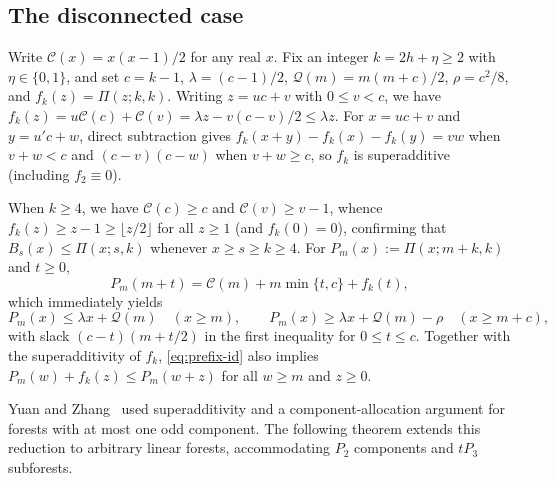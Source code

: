 \documentclass[10pt]{article}
\theoremstyle{compactplain}
\theoremstyle{remark}\newtheorem{remark}[theorem]{Remark}
\begin{document}
\subsection{The disconnected case}

Write $\mathcal{C}(x)=x(x-1)/2$ for any real $x$. Fix an integer
$k=2h+\eta\ge2$ with $\eta\in\{0,1\}$, and set $c=k-1$,
$\lambda=(c-1)/2$, $\mathcal{Q}(m)=m(m+c)/2$, $\rho=c^2/8$, and
$f_k(z)=\Pi(z;k,k)$. Writing $z=uc+v$ with $0\le v<c$, we have
$f_k(z)=u\mathcal{C}(c)+\mathcal{C}(v)=\lambda z-v(c-v)/2\le\lambda z$.
For $x=uc+v$ and $y=u'c+w$, direct subtraction gives
$f_k(x+y)-f_k(x)-f_k(y)=vw$ when $v+w<c$ and $(c-v)(c-w)$ when
$v+w\ge c$, so $f_k$ is superadditive (including $f_2\equiv0$).

When $k\ge4$, we have $\mathcal{C}(c)\ge c$ and
$\mathcal{C}(v)\ge v-1$, whence $f_k(z)\ge z-1\ge\lfloor z/2\rfloor$ for
all $z\ge1$ (and $f_k(0)=0$), confirming that $B_s(x)\le\Pi(x;s,k)$
whenever $x\ge s\ge k\ge4$. For $P_m(x):=\Pi(x;m+k,k)$ and $t\ge0$,
\begin{equation}\label{eq:prefix-id}
 P_m(m+t)=\mathcal{C}(m)+m\min\{t,c\}+f_k(t),
\end{equation}
which immediately yields
\begin{equation}\label{eq:affine-prefix}
 P_m(x)\le\lambda x+\mathcal{Q}(m)\quad(x\ge m),\qquad
 P_m(x)\ge\lambda x+\mathcal{Q}(m)-\rho\quad(x\ge m+c),
\end{equation}
with slack $(c-t)(m+t/2)$ in the first inequality for $0\le t\le c$.
Together with the superadditivity of $f_k$, \eqref{eq:prefix-id} also
implies $P_m(w)+f_k(z)\le P_m(w+z)$ for all $w\ge m$ and $z\ge0$.

Yuan and Zhang~\cite[Lemma~2.3]{YZ} used superadditivity and a
component-allocation argument for forests with at most one odd
component. The following theorem extends this reduction to arbitrary
linear forests, accommodating $P_2$ components and $tP_3$ subforests.
\end{document}
